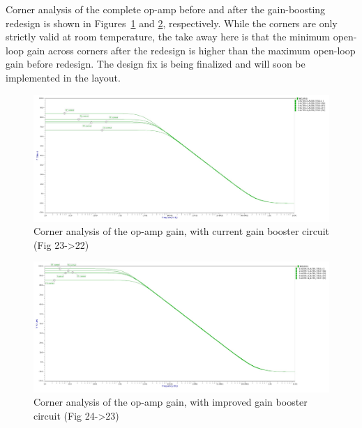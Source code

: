 Corner analysis of the complete op-amp before and after the gain-boosting redesign is shown in Figures~\ref{fig:opamp_gain_rt} and \ref{fig:opamp_gain_m_rt}, respectively. While the corners are only strictly valid at room temperature, the take away here is that the minimum open-loop gain across corners after the redesign is higher than the maximum open-loop gain before redesign. The design fix is being finalized and will soon be implemented in the layout.

\begin{figure}[h!]
\centering
  \includegraphics[width=0.8\linewidth]{figures/prakash_fig/opamp_gain_rt.JPG}
  \caption{Corner analysis of the op-amp gain, with current gain booster circuit (Fig 23->22)}
  \label{fig:opamp_gain_rt}
\end{figure}

\begin{figure}[h!]
\centering
  \includegraphics[width=0.8\linewidth]{figures/prakash_fig/opamp_gain_m_rt.JPG}
  \caption{Corner analysis of the op-amp gain, with improved gain booster circuit (Fig 24->23)}
  \label{fig:opamp_gain_m_rt}
\end{figure}


